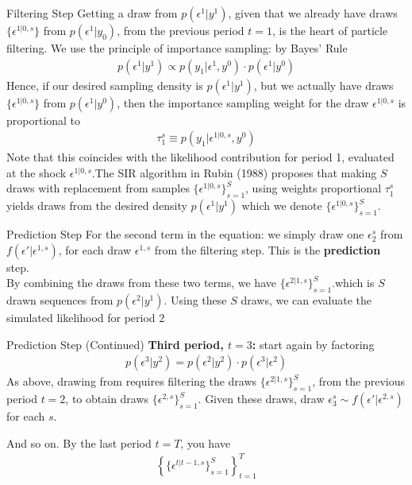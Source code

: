\begin{frame}{Filtering Step}
Getting a draw from $p(\epsilon^1| y^1)$, given that we already have draws $\{\epsilon^{1|0,s} \}$ from $p(\epsilon^1 | y_0)$, from the previous period $t = 1$, is the heart of particle filtering. We use the principle of importance sampling: by Bayes' Rule
\begin{eqnarray*}
p(\epsilon^1 | y^1) \propto p(y_1 | \epsilon^1, y^0) \cdot p (\epsilon^1 | y^0)
\end{eqnarray*}
Hence, if our desired sampling density is $p(\epsilon^1 | y^1)$, but we actually have draws $\{ \epsilon^{1|0,s}\}$ from $p(\epsilon^1| y^0)$, then the importance sampling weight for the draw
 $\epsilon^{1|0,s}$ is proportional to
\begin{eqnarray*}
\tau_1^s \equiv p(y_1 | \epsilon^{1|0,s},y^0)
\end{eqnarray*}
Note that this coincides with the likelihood contribution for period 1, evaluated at the shock $\epsilon^{1|0,s}$.The SIR algorithm in Rubin (1988) proposes that making $S$ draws with replacement from samples $\{ \epsilon^{1|0,s}\}_{s=1}^S$, using weights proportional $\tau_1^s$ yields draws from the desired density $p(\epsilon^1 | y^1)$ which we denote $\{ \epsilon^{1|0,s}\}_{s=1}^S$.
\end{frame}

\begin{frame}{Prediction Step}
For the second term in the equation: we simply draw one $\epsilon_2^s$ from $f(\epsilon' | \epsilon^{1,s})$, for each draw $\epsilon^{1,s}$ from the filtering step. This is the \textbf{prediction} step.\\
\vspace{0.25cm}
By combining the draws from these two terms, we have $\{ \epsilon^{2|1,s}\}_{s=1}^S$.which is $S$ drawn sequences from $p(\epsilon^2 | y^1)$. Using these $S$ draws, we can evaluate the simulated likelihood for period 2
\end{frame}

\begin{frame}{Prediction Step (Continued)}
\textbf{Third period, $t = 3$:} start again by factoring
\begin{eqnarray*}
p(\epsilon^3 | y^2) = p(\epsilon^2 | y^2) \cdot p(\epsilon^3 | \epsilon^2)
\end{eqnarray*}
As above, drawing from  requires filtering the draws $\{ \epsilon^{2|1,s}\}_{s=1}^S$, from the previous period $t = 2$, to obtain draws $\{ \epsilon^{2,s}\}_{s=1}^S$. Given these draws, draw $\epsilon_3^s \sim f(\epsilon' | \epsilon^{2,s})$ for each $s$.

And so on. By the last period $t = T$, you have
\begin{eqnarray*}
\left\{ \{ \epsilon^{t|t-1,s}\}_{s=1}^S \right\}_{t=1}^T
\end{eqnarray*}
\end{frame}

